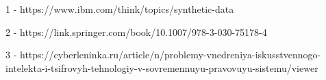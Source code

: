 {\par}

\begingroup
\renewcommand{\section}[2]{}
\begin{thebibliography}{}

1 - https://www.ibm.com/think/topics/synthetic-data

2 - https://link.springer.com/book/10.1007/978-3-030-75178-4

3 - https://cyberleninka.ru/article/n/problemy-vnedreniya-iskusstvennogo-intelekta-i-tsifrovyh-tehnologiy-v-sovremennuyu-pravovuyu-sistemu/viewer
	
\end{thebibliography}
\endgroup
